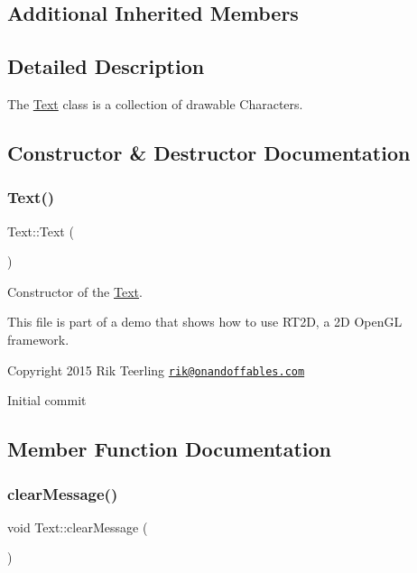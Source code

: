 \subsection*{Additional Inherited Members}


\subsection{Detailed Description}
The \hyperlink{class_text}{Text} class is a collection of drawable Characters. 

\subsection{Constructor \& Destructor Documentation}
\mbox{\label{class_text_ab3e26143fccc52699bcc5149cae852bc}} 
\subsubsection{\texorpdfstring{Text()}{Text()}}
{\footnotesize\ttfamily Text\+::\+Text (\begin{DoxyParamCaption}{ }\end{DoxyParamCaption})}



Constructor of the \hyperlink{class_text}{Text}. 

This file is part of a demo that shows how to use R\+T2D, a 2D Open\+GL framework.


\begin{DoxyItemize}
\item Copyright 2015 Rik Teerling \href{mailto:rik@onandoffables.com}{\tt rik@onandoffables.\+com}
\begin{DoxyItemize}
\item Initial commit 
\end{DoxyItemize}
\end{DoxyItemize}

\subsection{Member Function Documentation}
\mbox{\label{class_text_afdd312f98458f1bb34efd9112600cf2d}} 
\subsubsection{\texorpdfstring{clear\+Message()}{clearMessage()}}
{\footnotesize\ttfamily void Text\+::clear\+Message (\begin{DoxyParamCaption}{ }\end{DoxyParamCaption})}



